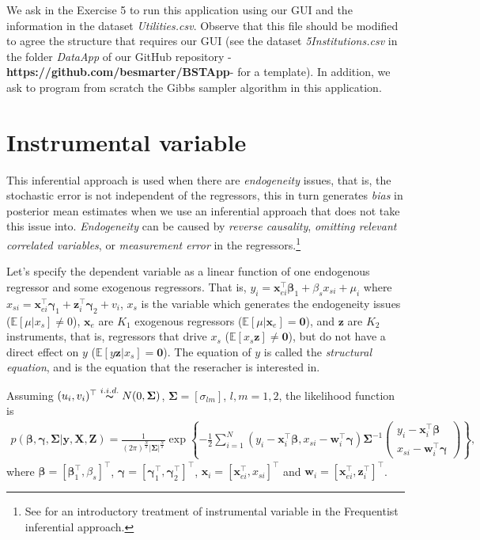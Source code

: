 We ask in the Exercise 5 to run this application using our GUI and the information in the dataset \textit{Utilities.csv}. Observe that this file should be modified to agree the structure that requires our GUI (see the dataset \textit{5Institutions.csv} in the folder \textit{DataApp} of our GitHub repository -\textbf{https://github.com/besmarter/BSTApp}- for a template). In addition, we ask to program from scratch the Gibbs sampler algorithm in this application.  

\section{Instrumental variable}\label{sec73}

This inferential approach is used when there are \textit{endogeneity} issues, that is, the stochastic error is not independent of the regressors, this in turn generates \textit{bias} in posterior mean estimates when we use an inferential approach that does not take this issue into. \textit{Endogeneity} can be caused by \textit{reverse causality}, \textit{omitting relevant correlated variables}, or \textit{measurement error} in  the regressors.\footnote{See \cite[Chap. ~15]{wooldridge2016introductory} for an introductory treatment of instrumental variable in the Frequentist inferential approach.}

Let's specify the dependent variable as a linear function of one endogenous regressor and some exogenous regressors. That is, $y_{i} =\bm{x}_{ei}^{\top}\bm{\beta}_1+\beta_sx_{si}+\mu_{i}$ where $x_{si} =\bm{ x}_{ei}^{\top}\bm{\gamma}_1+\bm{z}_i^{\top}\bm{\gamma}_2+v_{i}$, ${x}_{s}$ is the variable which generates the endogeneity issues ($\mathbb{E}[\mu|x_{s}]\neq 0$), $\bm{x}_e$ are $K_1$ exogenous regressors ($\mathbb{E}[\mu|\bm{x}_{e}]= \bm{0}$), and $\bm{z}$ are $K_2$ instruments, that is, regressors that drive $x_s$ ($\mathbb{E}[x_{s}\bm{z}]\neq \bm{0}$), but do not have a direct effect on $y$ ($\mathbb{E}[y\bm{z}|x_s]= \bm{0}$). The equation of $y$ is called the \textit{structural equation}, and is the equation that the reseracher is interested in.

Assuming $(u_{i},v_i)^{\top}\stackrel{i.i.d.} {\thicksim} {N}(0,\bm{\Sigma})$, $\bm{\Sigma}=[\sigma_{lm}]$, $l,m=1,2$, the likelihood function is
\begin{align*}
	p(\bm{\beta},\bm{\gamma},\bm{\Sigma}|\bm{y},\bm{X},\bm{Z})=\frac{1}{(2\pi)^\frac{N}{2}|\bm{\Sigma}|^\frac{N}{2}}\exp\left\{-\frac{1}{2}\sum_{i=1}^N(y_i-\bm{x}_i^{\top}\bm{\beta}, x_{si} -\bm{w}_i^{\top}\bm{\gamma})\bm{\Sigma}^{-1}
	\begin{pmatrix}
		y_i-\bm{x}_i^{\top}\bm{\beta} \\
		x_{si}-\bm{w}_i^{\top}\bm{\gamma}
	\end{pmatrix}
	\right\},
\end{align*}
where $\bm{\beta}=\left[\bm{\beta}_1^{\top},\beta_s\right]^{\top}$, $\bm{\gamma}=\left[\bm{\gamma}_1^{\top},\bm{\gamma}_2^{\top}\right]^{\top}$, $\bm{x}_i=\left[\bm{x}_{ei}^{\top},x_{si}\right]^{\top}$ and $\bm{w}_i=\left[\bm{x}_{ei}^{\top},\bm{z}_{i}^{\top}\right]^{\top}$.

